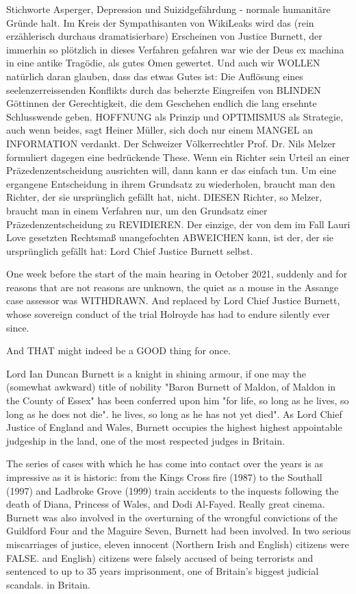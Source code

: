 \begin{multicols}{2}
{Stichworte Asperger, Depression und Suizidgefährdung
- normale humanitäre Gründe halt.\textCR
Im Kreis der Sympathisanten von WikiLeaks wird das
(rein erzählerisch durchaus dramatisierbare) Erscheinen
von Justice Burnett, der immerhin so plötzlich in dieses
Verfahren gefahren war wie der Deus ex machina in eine
antike Tragödie, als gutes Omen gewertet. Und auch wir
WOLLEN natürlich daran glauben, dass das etwas Gutes
ist: Die Auflösung eines seelenzerreissenden Konflikts
durch das beherzte Eingreifen von BLINDEN Göttinnen
der Gerechtigkeit, die dem Geschehen endlich die lang
ersehnte Schlusswende geben. HOFFNUNG als Prinzip
und OPTIMISMUS als Strategie, auch wenn beides, sagt
Heiner Müller, sich doch nur einem MANGEL an INFORMATION verdankt.\textCR
Der Schweizer Völkerrechtler Prof. Dr. Nils Melzer formuliert dagegen eine bedrückende These. Wenn ein
Richter sein Urteil an einer Präzedenzentscheidung
ausrichten will, dann kann er das einfach tun. Um eine
ergangene Entscheidung in ihrem Grundsatz zu wiederholen, braucht man den Richter, der sie ursprünglich gefällt hat, nicht. DIESEN Richter, so Melzer, braucht man
in einem Verfahren nur, um den Grundsatz einer Präzedenzentscheidung zu REVIDIEREN. Der einzige, der von
dem im Fall Lauri Love gesetzten Rechtsmaß unangefochten ABWEICHEN kann, ist der, der sie ursprünglich
gefällt hat: Lord Chief Justice Burnett selbst.}


One week before the start of the main hearing in October 2021, suddenly and for reasons that are not
reasons are unknown, the quiet as a mouse in the
Assange case assessor was WITHDRAWN. And replaced by
Lord Chief Justice Burnett, whose sovereign conduct of the trial Holroyde has had to endure silently ever since.

And THAT might indeed be a GOOD thing for once.

Lord Ian Duncan Burnett is a knight in shining armour, if one may
the (somewhat awkward) title of nobility "Baron Burnett of Maldon, of Maldon in the County of Essex" has been conferred upon him "for life, so long as he lives, so long as he does not die".
he lives, so long as he has not yet died". As Lord
Chief Justice of England and Wales, Burnett occupies the highest
highest appointable judgeship in the land, one of the most respected judges in Britain.

The series of cases with which he has come into contact over the years
is as impressive as it is historic: from the Kings Cross fire (1987) to the Southall (1997) and Ladbroke Grove (1999) train accidents
to the inquests following the death of Diana,
Princess of Wales, and Dodi Al-Fayed. Really great
cinema. Burnett was also involved in the overturning of the wrongful convictions of the Guildford Four and the Maguire
Seven, Burnett had been involved. In two serious miscarriages of justice, eleven innocent (Northern Irish and English) citizens were FALSE.
and English) citizens were falsely accused of being terrorists and sentenced to up to 35 years imprisonment, one of Britain's biggest judicial scandals.
in Britain.


\end{multicols}

